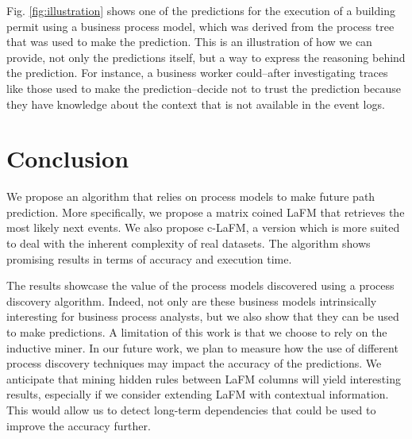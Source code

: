 \documentclass[runningheads]{llncs}
\begin{document}
Fig. \ref{fig:illustration} shows one of the predictions for the execution of a building permit using a business process model, which was derived from the process tree that was used to make the prediction. This is an illustration of how we can provide, not only the predictions itself, but a way to express the reasoning behind the prediction. For instance, a business worker could--after investigating traces like those used to make the prediction--decide not to trust the prediction because they have knowledge about the context that is not available in the event logs.

\section{Conclusion}
We propose an algorithm that relies on process models to make future path prediction. More specifically, we propose a matrix coined LaFM that retrieves the most likely next events. We also propose c-LaFM, a version which is more suited to deal with the inherent complexity of real datasets. The algorithm shows promising results in terms of accuracy and execution time. 

The results showcase the value of the process models discovered using a process discovery algorithm. Indeed, not only are these business models intrinsically interesting for business process analysts, but we also show that they can be used to make predictions. A limitation of this work is that we choose to rely on the inductive miner. In our future work, we plan to measure how the use of different process discovery techniques may impact the accuracy of the predictions. We anticipate that mining hidden rules between LaFM columns will yield interesting results, especially if we consider extending LaFM with contextual information. This would allow us to detect long-term dependencies that could be used to improve the accuracy further.
\end{document}
